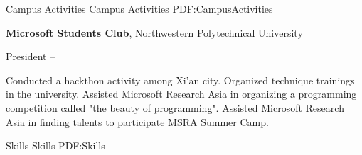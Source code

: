 \documentclass[letterpaper,MMMyyyy,nonstopmode]{simpleresumecv}
\begin{document}
\begin{Body}
\Section
{Campus Activities}
{Campus Activities}
{PDF:CampusActivities}

\Entry
\textbf{Microsoft Students Club},
Northwestern Polytechnical University

\Gap
\BulletItem
President
\hfill
{} --
\begin{Detail}
\SubBulletItem
Conducted a hackthon activity among Xi'an city.
\SubBulletItem
Organized technique trainings in the university.
\SubBulletItem
Assisted Microsoft Research Asia in organizing a programming competition called "the beauty of programming".
\SubBulletItem
Assisted Microsoft Research Asia in finding talents to participate MSRA Summer Camp.
\end{Detail}










\Section
{Skills}
{Skills}
{PDF:Skills}


\end{Body}
\end{document}
